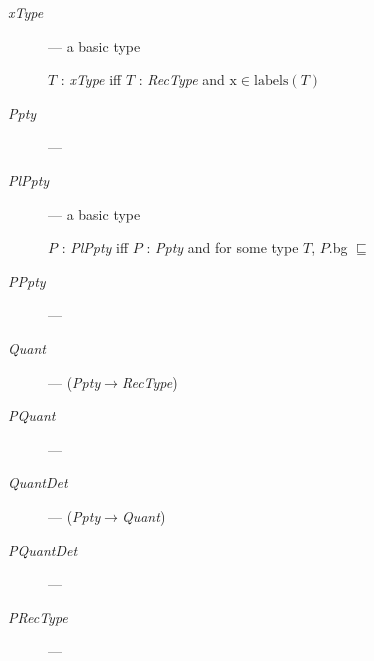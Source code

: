\begin{description}
      
      
    \item[\textnormal{\textit{xType}}] --- a basic type

      $T$ : \textit{xType} iff $T$ : \textit{RecType} and $\text{x}\in\mathrm{labels}(T)$

      \item[\textnormal{\textit{Ppty}}] ---
        
      \item[\textnormal{\textit{PlPpty}}] --- a basic type

        $P$ : \textit{PlPpty} iff $P$ : \textit{Ppty} and for some type $T$,
$P$.bg $\sqsubseteq$  
        
      \item[\textnormal{\textit{PPpty}}] --- 
        
      \item[\textnormal{\textit{Quant}}] ---
        (\textit{Ppty}$\rightarrow$\textit{RecType})
        
      \item[\textnormal{\textit{PQuant}}] --- 
        
      \item[\textnormal{\textit{QuantDet}}] ---
        (\textit{Ppty}$\rightarrow$\textit{Quant})
        
      \item[\textnormal{\textit{PQuantDet}}] ---
        
      \item[\textnormal{\textit{PRecType}}] ---
          


\end{description}
